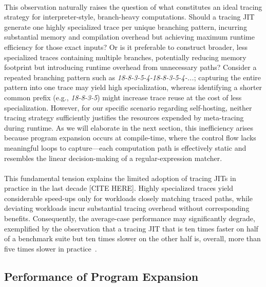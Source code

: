 			\paragraph{}%
				This observation naturally raises the question of what constitutes an ideal tracing strategy for interpreter-style, branch-heavy computations. Should a tracing JIT generate one highly specialized trace per unique branching pattern, incurring substantial memory and compilation overhead but achieving maximum runtime efficiency for those exact inputs? Or is it preferable to construct broader, less specialized traces containing multiple branches, potentially reducing memory footprint but introducing runtime overhead from unnecessary paths? Consider a repeated branching pattern such as \emph{18-8-3-5-4-18-8-3-5-4-...}; capturing the entire pattern into one trace may yield high specialization, whereas identifying a shorter common prefix (e.g., \emph{18-8-3-5}) might increase trace reuse at the cost of less specialization. However, for our specific scenario regarding self-hosting, neither tracing strategy sufficiently justifies the resources expended by meta-tracing during runtime. As we will elaborate in the next section, this inefficiency arises because program expansion occurs at compile-time, where the control flow lacks meaningful loops to capture—each computation path is effectively static and resembles the linear decision-making of a regular-expression matcher.

			\paragraph{}%
				This fundamental tension explains the limited adoption of tracing JITs in practice in the last decade [CITE HERE]. Highly specialized traces yield considerable speed-ups only for workloads closely matching traced paths, while deviating workloads incur substantial tracing overhead without corresponding benefits. Consequently, the average-case performance may significantly degrade, exemplified by the observation that a tracing JIT that is ten times faster on half of a benchmark suite but ten times slower on the other half is, overall, more than five times slower in practice~\cite{mozblog}.

		\subsection{Performance of Program Expansion}
			\label{section:there-is-no-loop}

